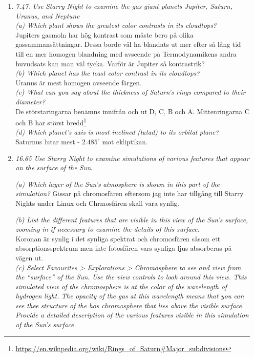\documentclass[./exercises.tex]{subfiles}
\begin{document}
\begin{enumerate}
\item \textit{7.47. Use Starry Night to examine the gas giant planets Jupiter, Saturn, Uranus, and
Neptune}\\
\textit{(a) Which plant shows the greatest color contrasts in its cloudtops?}\\

Jupiters gasmoln har hög kontrast som måste bero på olika gassammansättningar. Dessa borde väl ha blandats
ut mer efter så lång tid till en mer homogen blandning med avseende på Termodynamikens andra huvudsats kan man väl tycka.
Varför är Jupiter så kontrastrik?\\

\textit{(b) Which planet has the least color contrast in its cloudtops?}\\

Uranus är mest homogen avseende färgen.\\
\textit{(c) What can you say about the thickness of Saturn’s rings compared to their diameter?}\\

De störstaringarna benämns innifrån och ut D, C, B och A. Mittenringarna C och B har störst bredd\footnote{\url{https://en.wikipedia.org/wiki/Rings_of_Saturn\#Major_subdivisions}}\\

\textit{(d) Which planet’s axis is most inclined (lutad) to its orbital plane?}\\

Saturnus lutar mest - $2.485^\circ$ mot ekliptikan.\\

\item \textit{16.65 Use Starry Night to examine simulations of various features that appear on the
surface of the Sun}.

\textit{(a) Which layer of the Sun’s atmosphere is shown in this part of the simulation?}
Gissar på chromosfären eftersom jag inte har tillgång till Starry Nights under Linux och Chrmosfären skall vara
synlig.

\textit{(b) List the different features that are visible in this view of the Sun’s surface, zooming in if
necessary to examine the details of this surface.}\\
Koronan är synlig i det synliga spektrat och chromosfären såsom ett absorptionsspektrum men inte fotosfären vars synliga ljus absorberas på vägen ut.\\


\textit{(c) Select Favourites > Explorations > Chromosphere to see and view from the “surface” of the
Sun. Use the view controls to look around this view. This simulated view of the chromosphere is at
the color of the wavelength of hydrogen light. The opacity of the gas at this wavelength means that
you can see thee structure of the hos chromosphere that lies above the visible surface. Provide a
detailed description of the various features visible in this simulation of the Sun’s surface.}



\end{enumerate}
\end{document}
